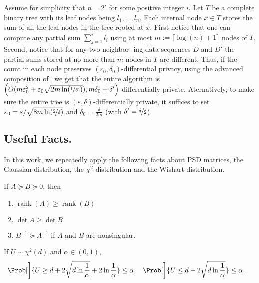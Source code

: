 \documentclass{article}
\newcommand{\inv}[1]{#1^{-1}}
\newcommand{\rank}{\operatorname{rank}}
\renewcommand{\det}{\operatorname{det}}
\begin{document}
Assume for simplicity that $n=2^i$ for some positive integer $i$. Let $T$ be a complete binary tree with its leaf nodes being $l_1,...,l_n$. Each internal
node $x\in T$ stores the sum of all the leaf nodes in the tree
rooted at $x$. First notice that one can compute any partial sum $\sum_{j=1}^i l_i$ using at most $m:=\lceil\log(n)+1\rceil$ nodes of $T$. Second, notice that for any two neighbor-
ing data sequences $D$ and $D'$ the partial sums stored at no more than $m$ nodes in $T$ are different. Thus, if the count in each node preserves $(\varepsilon_0,\delta_0)$-differential privacy, using the advanced composition of~\cite{DworkBoosting2010} we get that the entire algorithm is $\left(O(m\varepsilon_0^2+\varepsilon_0\sqrt{2m\ln(\nicefrac 1{\delta'})}), m\delta_0 + \delta'\right)$-differentially private. Aternatively, to make sure the entire tree is $(\varepsilon,\delta)$-differentially private, it suffices to set $\varepsilon_0 = \varepsilon / \sqrt{8m\ln(\nicefrac 2 \delta)}$ and $\delta_0= \tfrac \delta{2m}$ (with $\delta'=\nicefrac \delta 2$).

\subsection{Useful Facts.}
\label{apx_subsec:facts}

In this work, we repeatedly apply the following facts about PSD matrices, the Gaussian distribution, the $\chi^2$-distribution and the Wishart-distribution.

\begin{claim}%
  \label{claim:psd-matrix-props}%
  If $A \succeq B \succeq 0$, then
  \begin{enumerate}[nolistsep]
  \item $\rank(A) \ge \rank(B)$
  \item $\det A \ge \det B$
  \item $\inv{B} \succeq \inv{A}$ if $A$ and $B$ are nonsingular.
  \end{enumerate}
\end{claim}

\begin{claim}%
  \label{claim:chi2-tails}
  If $U\sim\chi^2(d)$ and $\alpha\in(0,1)$,
  \begin{align*}
    \Prob[\bigg]{U \ge d + 2\sqrt{d\ln\frac{1}{\alpha}} + 2\ln\frac{1}{\alpha}} &\le \alpha,
    & \Prob[\bigg]{U \le d - 2\sqrt{d\ln\frac{1}{\alpha}}} &\le \alpha.
  \end{align*}
\end{claim}
\end{document}
